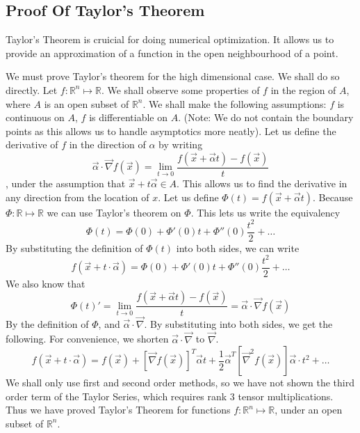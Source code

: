 \documentclass[10pt]{article}
\begin{document}
\subsection*{Proof Of Taylor's Theorem}
Taylor's Theorem is cruicial for doing numerical optimization. It allows us to provide an approximation of a function in the open neighbourhood of a point.

We must prove Taylor's theorem for the high dimensional case. We shall do so directly.
Let $f : \mathbb{R}^n \mapsto \mathbb{R}$. We shall observe some properties of $f$ in the region of $A$, where $A$ is an open subset of $\mathbb{R}^n$. We shall make the following assumptions: $f$ is continuous on $A$, $f$ is differentiable on $A$. (Note: We do not contain the boundary points as this allows us to handle asymptotics more neatly). 
Let us define the derivative of $f$ in the direction of $\alpha$ by writing \begin{equation}\vec{\alpha} \cdot \vec{\nabla} f(\vec{x}) = \lim_{t \to 0}\frac{f(\vec{x} + \vec{\alpha}t) - f(\vec{x})}{t}\end{equation}, under the assumption that $\vec{x} + t \vec{\alpha} \in A$. This allows us to find the derivative in any direction from the location of $x$. Let us define $\Phi(t) = f(\vec{x} + \vec{\alpha} t)$. Because $\Phi : \mathbb{R} \mapsto \mathbb{R}$
we can use Taylor's theorem on $\Phi$. This lets us write the equivalency 
\begin{equation}\Phi(t) = \Phi(0) + \Phi'(0)t + \Phi''(0)\frac{t^2}{2} + \dots\end{equation}
By substituting the definition of $\Phi(t)$ into both sides, we can write 
\begin{equation} f(\vec{x} + t \cdot \vec{\alpha}) = \Phi(0) + \Phi'(0)t + \Phi''(0)\frac{t^2}{2} + \dots\end{equation}
We also know that 
\begin{equation}\Phi(t)' = \lim_{t \to 0}\frac{f(\vec{x} + \vec{\alpha}t) - f(\vec{x})}{t} = \vec{\alpha} \cdot \vec{\nabla}f(\vec{x})\end{equation}
By the definition of $\Phi$, and $\vec{\alpha} \cdot \vec{\nabla}$.
By substituting into both sides, we get the following. For convenience, we shorten $\vec{\alpha}\cdot\vec{\nabla}$ to $\vec{\nabla}$.
\begin{equation} f(\vec{x} + t \cdot \vec{\alpha}) = f(\vec{x}) + [\vec{\nabla}f(\vec{x})]^T\vec{\alpha} t + \frac{1}{2}\vec{\alpha}^T[\vec{\nabla}^2f(\vec{x})]\vec{\alpha} \cdot t^2 + \dots\end{equation}
We shall only use first and second order methods, so we have not shown the third order term of the Taylor Series, which requires rank 3 tensor multiplications.
Thus we have proved Taylor's Theorem for functions $f : \mathbb{R}^n \mapsto \mathbb{R}$, under an open subset of $\mathbb{R}^n$.
\end{document}
